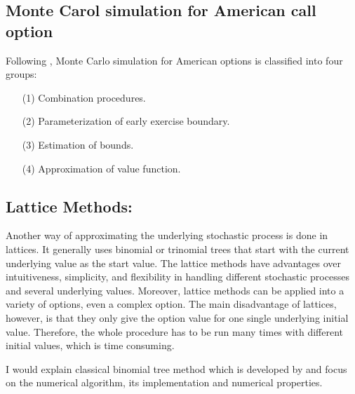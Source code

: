 \documentclass[11pt,letter]{article}
\theoremstyle{definition}
\theoremstyle{remark}
\numberwithin{equation}{section}
\begin{document}
\subsection{Monte Carol simulation for American call option} 
Following \cite{schumerich2010real}, Monte Carlo simulation for American options is classified into four groups:
    \begin{itemize}
        \item[(1)] Combination procedures.
        \item[(2)] Parameterization of early exercise boundary.
        \item[(3)] Estimation of bounds.
        \item[(4)] Approximation of value function.
    \end{itemize}


\subsection{Lattice Methods: \cite{cox1979option}}
Another way of approximating the underlying stochastic process is done in lattices. It generally uses binomial or trinomial trees that start with the current underlying value as the start value. The lattice methods have advantages over intuitiveness, simplicity, and flexibility in handling different stochastic processes and several underlying values. Moreover, lattice methods can be applied into a variety of options, even a complex option. The main disadvantage of lattices, however, is that they only give the option value for one single underlying initial value. Therefore, the whole procedure has to be run many times with different initial values, which is time consuming.

I would explain classical binomial tree method which is developed by \cite{cox1979option} and focus on the numerical algorithm, its implementation and numerical properties.
\end{document}
